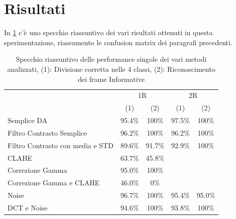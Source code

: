\section{Risultati}\label{risultati}

In \cref{tab:specchio-single} c'è uno specchio riassuntivo dei vari risultati ottenuti in questa sperimentazione, riassumento le confusion matrix dei paragrafi precedenti.

\begin{table}[H]
    \centering
    \begin{tabular}{l|cc|cc}
                                     & \multicolumn{2}{c|}{1R}                                                   & \multicolumn{2}{c}{2R}                                                   \\
                                     & (1) & (2) & (1) & (2) \\ \midrule
    Semplice DA                      & 95.4\%                            & 100\%                                & 97.5\%                            & 100\%                                \\
    Filtro Contrasto Semplice        & 96.2\%                            & 100\%                                & 96.2\%                            & 100\%                                \\
    Filtro Contrasto con media e STD & 89.6\%                            & 91.7\%                               & 92.9\%                            & 100\%                                \\
    CLAHE                            & 63.7\%                            & 45.8\%                               &                                   &                                      \\
    Correzione Gamma                 & 95.0\%                            & 100\%                                &                                   &                                      \\
    Correzione Gamma e CLAHE         & 46.0\%                            & 0\%                                  &                                   &                                      \\
    Noise                            & 96.7\%                            & 100\%                                & 95.4\%                            & 95.0\%                               \\
    DCT e Noise                      & 94.6\%                            & 100\%                                & 93.8\%                            & 100\%                             
    \end{tabular}
    \caption{Specchio riassuntivo delle performance singole dei vari metodi analizzati, (1): Divisione corretta nelle 4 classi, (2): Riconoscimento dei frame Informative}
    \label{tab:specchio-single}
\end{table}



